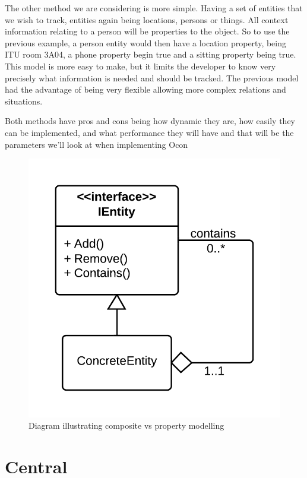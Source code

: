 \documentclass[../report.tex]{subfiles}
\begin{document}
The other method we are considering is more simple. Having a set of entities that we wish to track, entities again being locations, persons or things. All context information relating to a person will be properties to the object. So to use the previous example, a person entity would then have a location property, being ITU room 3A04, a phone property begin true and a sitting property being true. This model is more easy to make, but it limits the developer to know very precisely what information is needed and should be tracked. The previous model had the advantage of being very flexible allowing more complex relations and situations. 

Both methods have pros and cons being how dynamic they are, how easily they can be implemented, and what performance they will have and that will be the parameters we'll look at when implementing Ocon 

\begin{figure}[h]
\centering
\includegraphics[width=\linewidth]{composite.png}
\caption{Diagram illustrating composite vs property modelling}
\label{fig:composite}
\end{figure}


\section{Central}
\end{document}

